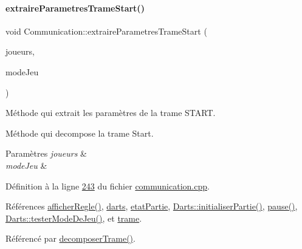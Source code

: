 \paragraph{\texorpdfstring{extraire\+Parametres\+Trame\+Start()}{extraireParametresTrameStart()}}
{\footnotesize\ttfamily void Communication\+::extraire\+Parametres\+Trame\+Start (\begin{DoxyParamCaption}\item[{Q\+String\+List \&}]{joueurs,  }\item[{Q\+String \&}]{mode\+Jeu }\end{DoxyParamCaption})\hspace{0.3cm}{\ttfamily [private]}}



Méthode qui extrait les paramètres de la trame S\+T\+A\+RT. 

Méthode qui decompose la trame Start.


\begin{DoxyParams}{Paramètres}
{\em joueurs} & \\
\hline
{\em mode\+Jeu} & \\
\hline
\end{DoxyParams}


Définition à la ligne \hyperlink{communication_8cpp_source_l00243}{243} du fichier \hyperlink{communication_8cpp_source}{communication.\+cpp}.



Références \hyperlink{class_communication_a4ee52f9b4a1a97967ab2c48a33e0e392}{afficher\+Regle()}, \hyperlink{communication_8h_source_l00093}{darts}, \hyperlink{communication_8h_source_l00100}{etat\+Partie}, \hyperlink{darts_8cpp_source_l00144}{Darts\+::initialiser\+Partie()}, \hyperlink{class_communication_a369c7aeadc5c5926eb701bdebe53972c}{pause()}, \hyperlink{darts_8cpp_source_l00506}{Darts\+::tester\+Mode\+De\+Jeu()}, et \hyperlink{communication_8h_source_l00099}{trame}.



Référencé par \hyperlink{communication_8cpp_source_l00188}{decomposer\+Trame()}.


